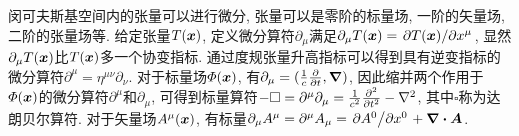 \begin{proposition}[张量的微分与积分]\label{pro:张量的微分与积分}
    闵可夫斯基空间内的张量可以进行微分, 张量可以是零阶的标量场, 一阶的矢量场, 二阶的张量场等. 给定张量$ T(\vb*{x}) $, 定义微分算符$ \partial_{\mu} $满足$ \partial_{\mu} T(\vb*{x}) = \pdv*{T(\vb*{x})}{x^{\mu}} $, 显然$ \partial_{\mu} T(\vb*{x}) $比$ T(\vb*{x}) $多一个协变指标. 通过度规张量升高指标可以得到具有逆变指标的微分算符$ \partial^{\mu}=\eta^{\mu\nu}\partial_{\nu} $. 对于标量场$ \varPhi(\vb*{x}) $, 有$ \partial_{\mu}=(\frac{1}{c}\pdv{t},\grad) $, 因此缩并两个作用于$ \varPhi(\vb*{x}) $的微分算符$ \partial^{\mu} $和$ \partial_{\mu} $, 可得到标量算符$ -\square = \partial^{\mu} \partial_{\mu} = \frac{1}{c^2} \pdv[2]{t} - \laplacian $, 其中$ \square $称为达朗贝尔算符. 对于矢量场$ A^{\mu}(\vb*{x}) $, 有标量$ \partial_{\mu}A^{\mu}=\partial^{\mu}A_{\mu}=\pdv*{A^0}{x^0} + \div{\vb*{A}} $.


\end{proposition}
